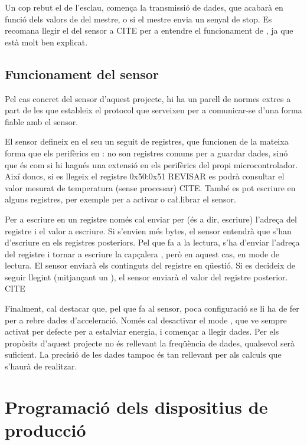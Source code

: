 Un cop rebut el  de l'esclau, comença la transmissió de
dades, que acabarà en funció dels valors de  del mestre, o
si el mestre envia un senyal de stop. Es recomana llegir el  del
sensor a CITE per a entendre el funcionament de , ja que està molt ben
explicat.

\subsection{Funcionament del sensor }

Pel cas concret del sensor d'aquest projecte, hi ha un parell de normes extres
a part de les que estableix el protocol  que serveixen per a comunicar-se
d'una forma fiable amb el sensor.

El sensor  defineix en el seu  un seguit de
registres, que funcionen de la mateixa forma que els perifèrics en :
no son registres comuns per a guardar dades, sinó que és com si hi hagués una
extensió en els perifèrics del propi microcontrolador. Així doncs, si es llegeix
el registre 0x50:0x51 REVISAR es podrà consultar el valor mesurat de temperatura
(sense processar) CITE. També es pot escriure en alguns registres, per exemple
per a activar o ca\l.librar el sensor.

Per a escriure en un registre només cal enviar per  (és a dir, escriure)
l'adreça del registre i el valor a escriure. Si s'envien més bytes, el sensor
entendrà que s'han d'escriure en els registres posteriors. Pel que fa a la lectura,
s'ha d'enviar l'adreça del registre i tornar a escriure la capçalera ,
però en aquest cas, en mode de lectura. El sensor enviarà els continguts del
registre en qüestió. Si es decideix de seguir llegint (mitjançant un ),
el sensor enviarà el valor del registre posterior. CITE

Finalment, cal destacar que, pel que fa al sensor, poca configuració se li ha de
fer per a rebre dades d'acceleració. Només cal desactivar el mode ,
que ve sempre activat per defecte per a estalviar energia, i començar a llegir
dades. Per els propòsits d'aquest projecte no és rellevant la freqüència de
dades, qualsevol serà suficient. La precisió de les dades tampoc és tan rellevant
per als calculs que s'haurà de realitzar.

\section{Programació dels dispositius de producció}

